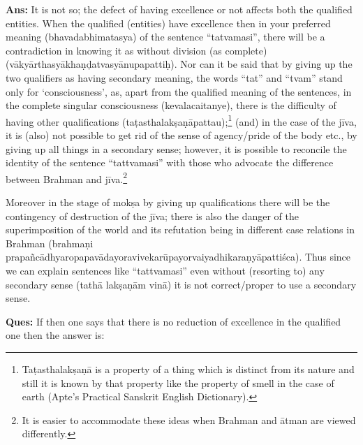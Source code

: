 \textbf{Ans:} It is not so; the defect of having excellence or not affects both the qualified entities.  When the qualified (entities) have excellence then in your preferred meaning (bhavadabhimatasya) of the sentence “tatvamasi”, there will be a contradiction in knowing it as without division (as complete) (vākyārthasyākhaṇḍatvasyānupapattiḥ). Nor can it be said that by giving up the two qualifiers as having secondary meaning, the words “tat” and “tvam” stand only for ‘consciousness’, as, apart from the qualified meaning of the sentences, in the complete singular consciousness (kevalacaitanye), there is the difficulty of having other qualifications (taṭasthalakṣaṇāpattau);\footnote{Taṭasthalakṣaṇā is a property of a thing which is distinct from its nature and still it is known by that property like the property of smell in the case of earth (Apte’s Practical Sanskrit English Dictionary).} (and) in the case of the jīva, it is (also) not possible to get rid of the sense of agency/pride of the body etc., by giving up all things in a secondary sense;  however, it is possible to reconcile the identity of the sentence “tattvamasi” with those who advocate the difference between Brahman and jīva.\footnote{It is easier to accommodate these ideas when Brahman and ātman are viewed differently.} 

Moreover in the stage of mokṣa by giving up qualifications there will be the contingency of destruction of the jīva; there is also the danger of the superimposition of the world and its refutation being in different case relations   in Brahman (brahmaṇi prapañcādhyaropapavādayoravivekarūpayorvaiyadhikaraṇyāpattiśca). Thus since we can explain sentences like “tattvamasi” even without (resorting to) any secondary sense (tathā lakṣaṇām vinā) it is not correct/proper to use a secondary sense.

\textbf{Ques:} If then one says that there is no reduction of excellence in the qualified one then the answer is:

